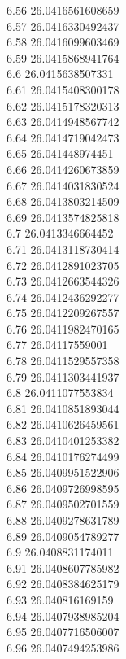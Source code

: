 {6.56	26.0416561608659\\
6.57	26.0416330492437\\
6.58	26.0416099603469\\
6.59	26.0415868941764\\
6.6	26.0415638507331\\
6.61	26.0415408300178\\
6.62	26.0415178320313\\
6.63	26.0414948567742\\
6.64	26.0414719042473\\
6.65	26.041448974451\\
6.66	26.0414260673859\\
6.67	26.0414031830524\\
6.68	26.0413803214509\\
6.69	26.0413574825818\\
6.7	26.0413346664452\\
6.71	26.0413118730414\\
6.72	26.0412891023705\\
6.73	26.0412663544326\\
6.74	26.0412436292277\\
6.75	26.0412209267557\\
6.76	26.0411982470165\\
6.77	26.04117559001\\
6.78	26.0411529557358\\
6.79	26.0411303441937\\
6.8	26.0411077553834\\
6.81	26.0410851893044\\
6.82	26.0410626459561\\
6.83	26.0410401253382\\
6.84	26.0410176274499\\
6.85	26.0409951522906\\
6.86	26.0409726998595\\
6.87	26.0409502701559\\
6.88	26.0409278631789\\
6.89	26.0409054789277\\
6.9	26.0408831174011\\
6.91	26.0408607785982\\
6.92	26.0408384625179\\
6.93	26.040816169159\\
6.94	26.0407938985204\\
6.95	26.0407716506007\\
6.96	26.0407494253986\\
}
